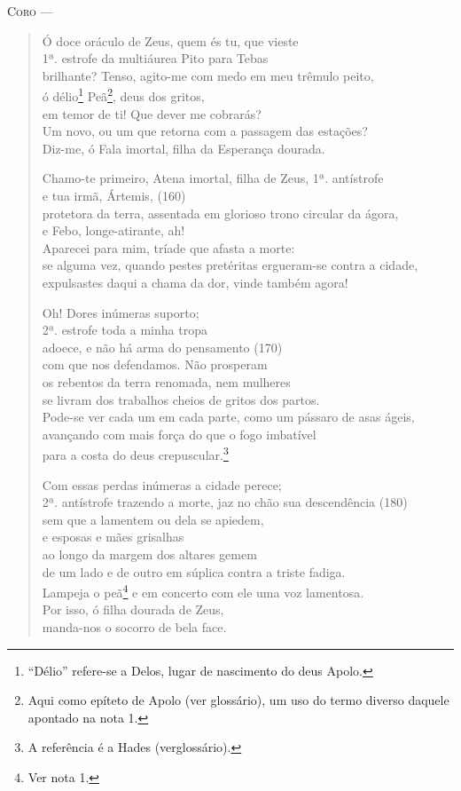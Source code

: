 \textsc{Coro} --- \begin{verse}Ó doce oráculo de Zeus, quem és tu, que vieste\\ 1ª. estrofe
da multiáurea Pito para Tebas\\
brilhante? Tenso, agito-me com medo em meu trêmulo peito,\\
ó délio\footnote{``Délio'' refere-se a Delos, lugar de nascimento do
deus Apolo.} Peã\footnote{Aqui como epíteto de Apolo (ver glossário),
um uso do termo diverso daquele apontado na nota 1.}, deus dos gritos,\\
em temor de ti! Que dever me cobrarás?\\
Um novo, ou um que retorna com a passagem das estações?\\
Diz-me, ó Fala imortal, filha da Esperança dourada.

Chamo-te primeiro, Atena imortal, filha de Zeus, 1ª. antístrofe\\
e tua irmã, Ártemis, (160)\\
protetora da terra, assentada em glorioso trono circular da ágora,\\
e Febo, longe-atirante, ah!\\
Aparecei para mim, tríade que afasta a morte:\\
se alguma vez, quando pestes pretéritas ergueram-se contra a cidade,\\
expulsastes daqui a chama da dor, vinde também agora!

Oh! Dores inúmeras suporto;\\ 2ª. estrofe
toda a minha tropa\\
adoece, e não há arma do pensamento (170)\\
com que nos defendamos. Não prosperam\\
os rebentos da terra renomada, nem mulheres\\
se livram dos trabalhos cheios de gritos dos partos.\\
Pode-se ver cada um em cada parte, como um pássaro de asas ágeis,\\
avançando com mais força do que o fogo imbatível\\
para a costa do deus crepuscular.\footnote{A referência é a Hades (verglossário).}

Com essas perdas inúmeras a cidade perece;\\ 2ª. antístrofe
trazendo a morte, jaz no chão sua descendência (180)\\
sem que a lamentem ou dela se apiedem,\\
e esposas e mães grisalhas\\
ao longo da margem dos altares gemem\\
de um lado e de outro em súplica contra a triste fadiga.\\
Lampeja o peã\footnote{Ver nota 1.} e em concerto com ele uma voz lamentosa.\\
Por isso, ó filha dourada de Zeus,\\
manda-nos o socorro de bela face.


\end{verse}
